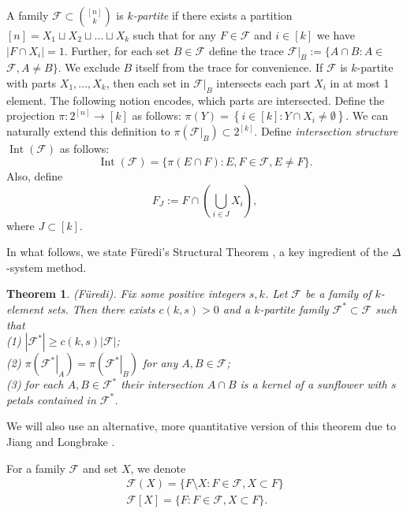 \documentclass[12pt,a4paper]{article}
\newtheorem{Theorem}{Theorem}
\begin{document}
A family $\mathcal{F} \subset\binom{[n]}{k}$ is \textit{$k$-partite} if there exists a partition $[n]=X_1 \sqcup X_2 \sqcup \ldots \sqcup X_k$ such that for any $F \in \mathcal{F}$ and $i \in[k]$ we have $\left|F \cap X_i\right|=1$. Further, for each set $B \in \mathcal{F}$ define the trace $\left.\mathcal{F}\right|_B:=\{A \cap B: A \in$ $\mathcal{F}, A \neq B\}$. We exclude $B$ itself from the trace for convenience. If $\mathcal{F}$ is $k$-partite with parts $X_1, \ldots, X_k$, then each set in $\left.\mathcal{F}\right|_B$ intersects each part $X_i$ in at most 1 element. The following notion encodes, which parts are intersected. Define the projection $\pi: 2^{[n]} \rightarrow[k]$ as follows: $\pi(Y)=\left\{i \in[k]: Y \cap X_i \neq \emptyset\right\}$. We can naturally extend this definition to $\pi\left(\left.\mathcal{F}\right|_B\right) \subset 2^{[k]}$. Define \textit{intersection structure} $\operatorname{Int}(\mathcal{F})$ as follows: 
$$
\operatorname{Int}(\mathcal{F})=\{\pi(E \cap F): E, F \in \mathcal{F}, E \neq F\}.
$$
Also, define
$$F_J:=F \cap\left(\bigcup_{i \in J} X_i\right),$$
where $J \subset [k].$

In what follows, we state F\"uredi’s Structural Theorem \cite{F}, a key ingredient of the $\Delta$-system method.

\begin{Theorem}\label{thm7}
(F\"uredi). Fix some positive integers $s,k$. Let $\mathcal{F}$ be a family of $k$-element sets. Then there exists $c(k, s)>0$ and a $k$-partite family $\mathcal{F}^* \subset \mathcal{F}$ such that\\
(1) $\left|\mathcal{F}^*\right| \geqslant c(k, s)|\mathcal{F}|$;\\
(2) $\pi\left(\left.\mathcal{F}^*\right|_A\right)=\pi\left(\left.\mathcal{F}^*\right|_B\right)$ for any $A, B \in \mathcal{F}$;\\
(3) for each $A, B \in \mathcal{F}^*$ their intersection $A \cap B$ is a kernel of a sunflower with $s$ petals contained in $\mathcal{F}^*$.
\end{Theorem}


We will also use an alternative, more quantitative version of this theorem due to Jiang and Longbrake \cite{JL}.

For a family $\mathcal{F}$ and set $X$, we denote 
\begin{align*}
    \mathcal{F}(X) = \{F \setminus X : F \in \mathcal{F}, X \subset F \}\\
    \mathcal{F}[X] = \{F: F \in \mathcal{F}, X \subset F \}.    
\end{align*}
\end{document}
